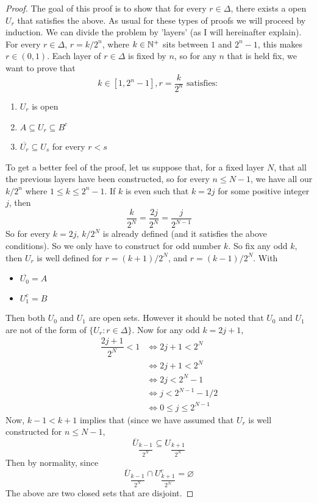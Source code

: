 \documentclass[../../main.tex]{subfiles}
\begin{document}
\begin{proof}
    The goal of this proof is to show that for every $r\in \Delta$, there exists a open $U_r$ that satisfies the above. As usual for these types of proofs we will proceed by induction. We can divide the problem by 'layers' (as I will hereinafter explain).\\
    
    For every $r\in \Delta$, $r = k/2^n$, where $k\in\mathbb{N}^+$ sits between $1$ and $2^n-1$, this makes $r\in (0,1)$. Each layer of $r\in \Delta$ is fixed by $n$, so for any $n$ that is held fix, we want to prove that
    \[
    k\in[1,2^n-1], r = \dfrac{k}{2^n} \text{ satisfies: }
    \]
    \begin{enumerate}
        \item $U_r$ is open
        \item $A\subseteq U_r\subseteq B^c$
        \item $\overline{U_r}\subseteq U_s$ for every $r<s$
    \end{enumerate}
    To get a better feel of the proof, let us suppose that, for a fixed layer $N$, that all the previous layers have been constructed, so for every $n\leq N-1$, we have all our $k/2^n$ where $1\leq k\leq 2^{n}-1$. If $k$ is even such that $k=2j$ for some positive integer $j$, then 
    \[
    \dfrac{k}{2^N} = \dfrac{2j}{2^N} = \dfrac{j}{2^{N-1}}
    \]
    So for every $k=2j$, $k/2^N$ is already defined (and it satisfies the above conditions). So we only have to construct for odd number $k$. So fix any odd $k$, then $U_r$ is well defined for $r = (k+1)/2^N$, and $r = (k-1)/2^N$. With 
    \begin{itemize}
        \item $\overline{U_0} = A$
        \item $U_1^c = B$
    \end{itemize}
    Then both $U_0$ and $U_1$ are open sets. However it should be noted that $U_0$ and $U_1$ are not of the form of $\{U_r: r\in \Delta\}$. Now for any odd $k = 2j+1$,
    \begin{align*}
        \dfrac{2j+1}{2^N}<1&\iff 2j+1< 2^N\\
        &\iff 2j+1<2^N\\
        &\iff 2j < 2^N-1\\
        &\iff j< 2^{N-1}-1/2\\
        &\iff 0\leq j\leq 2^{N-1}
    \end{align*}
    Now, $k-1<k+1$ implies that (since we have assumed that $U_r$ is well constructed for $n\leq N-1$,
    \[
    \overline{U}_{\dfrac{k-1}{2^N}}\subseteq U_{\dfrac{k+1}{2^N}}
    \]
    Then by normality, since
    \[
    \overline{U}_{\dfrac{k-1}{2^N}}\cap U^c_{\dfrac{k+1}{2^N}}=\varnothing
    \]
    The above are two closed sets that are disjoint.
    
\end{proof}
\end{document}
